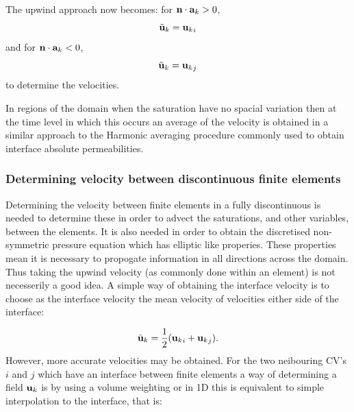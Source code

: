 The upwind approach now becomes: 
for ${\bf n}\cdot {\bf a}_k>0$, 
\begin{equation}
{\tilde{\bf u}_k} ={{\bf u}_k}_i 
\end{equation} 
and for ${\bf n}\cdot {\bf a}_k<0$,
\begin{equation}
{\tilde{\bf u}_k} ={{\bf u}_k}_j 
\end{equation} 
to determine the velocities. 

In regions of the domain when the saturation have 
no spacial variation then at the time level in which this occurs an average of the velocity 
is obtained in a similar approach to the Harmonic averaging procedure commonly used to 
obtain interface absolute permeabilities. 


\subsubsection{Determining velocity between discontinuous finite elements} 

Determining the velocity between finite elements in a fully discontinuous is needed 
 to determine these in order to advect the saturations, and other variables, 
between the elements. It is also needed in order to obtain the discretised 
non-symmetric pressure equation which has elliptic like properies. These properties 
mean it is necessary to propogate information in all directions across the domain. 
Thus taking the upwind velocity (as commonly done within an element) is not necesserily 
a good idea. 
A simple way of obtaining the interface velocity is to choose as the interface velocity the mean 
velocity of velocities either side of the interface: 

\begin{equation}
{\tilde{\bf u}_k} = \frac{1}{2} ({{\bf u}_k}_i+{{\bf u}_k}_j). 
\end{equation} 
However, more accurate velocities may be obtained. 
For the two neibouring CV's $i$ and $j$ which have an interface 
between finite elements a way of determining a field ${\bf u}_k$ is by using a volume 
weighting or in 1D this is equivalent to simple interpolation to the interface, that is: 

